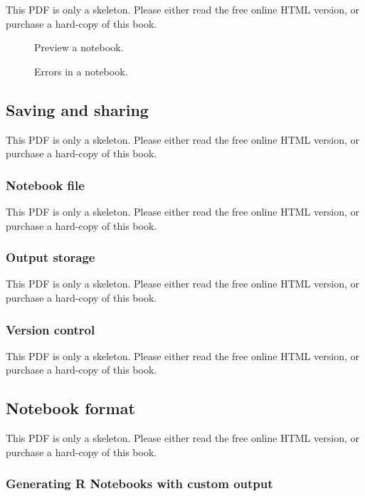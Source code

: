 \documentclass[
  11pt,
]{krantz}
\theoremstyle{definition}
\theoremstyle{definition}
\theoremstyle{definition}
\theoremstyle{definition}
\theoremstyle{remark}
\begin{document}
This PDF is only a skeleton. Please either read the free online HTML version, or purchase a hard-copy of this book.

\begin{figure}\caption{Preview a notebook.}\end{figure}

\begin{figure}\caption{Errors in a notebook.}\end{figure}

\subsection{Saving and sharing}\label{saving-and-sharing}

This PDF is only a skeleton. Please either read the free online HTML version, or purchase a hard-copy of this book.

\subsubsection{Notebook file}\label{notebook-file}

This PDF is only a skeleton. Please either read the free online HTML version, or purchase a hard-copy of this book.

\subsubsection{Output storage}\label{output-storage}

This PDF is only a skeleton. Please either read the free online HTML version, or purchase a hard-copy of this book.

\subsubsection{Version control}\label{version-control}

This PDF is only a skeleton. Please either read the free online HTML version, or purchase a hard-copy of this book.

\subsection{Notebook format}\label{notebook-format}

This PDF is only a skeleton. Please either read the free online HTML version, or purchase a hard-copy of this book.

\subsubsection{Generating R Notebooks with custom output}\label{generating-r-notebooks-with-custom-output}
\end{document}
